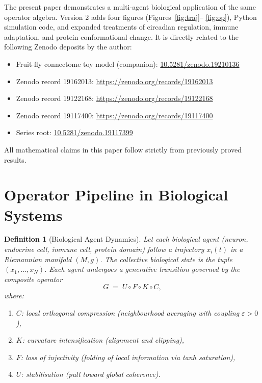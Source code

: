 \documentclass[12pt,a4paper]{article}
\newtheorem{definition}[theorem]{Definition}
\begin{document}
The present paper demonstrates a multi-agent biological application of the same
operator algebra.  Version 2 adds four figures (Figures~\ref{fig:traj}–%
\ref{fig:op}), Python simulation code, and expanded treatments of circadian
regulation, immune adaptation, and protein conformational change.  It is
directly related to the following Zenodo deposits by the author:

\begin{itemize}[nosep]
  \item Fruit-fly connectome toy model (companion):
    \href{https://doi.org/10.5281/zenodo.19210136}{10.5281/zenodo.19210136}
  \item Zenodo record 19162013:
    \url{https://zenodo.org/records/19162013}
  \item Zenodo record 19122168:
    \url{https://zenodo.org/records/19122168}
  \item Zenodo record 19117400:
    \url{https://zenodo.org/records/19117400}
  \item Series root: \href{https://doi.org/10.5281/zenodo.19117399}{10.5281/zenodo.19117399}
\end{itemize}

All mathematical claims in this paper follow strictly from previously proved
results.

\section{Operator Pipeline in Biological Systems}
\label{sec:pipeline}

\begin{definition}[Biological Agent Dynamics]
\label{def:agent}
Let each biological agent (neuron, endocrine cell, immune cell, protein domain)
follow a trajectory $x_i(t)$ in a Riemannian manifold $(M, g)$.  The collective
biological state is the tuple $(x_1, \ldots, x_N)$.  Each agent undergoes a
generative transition governed by the composite operator
\[
  G \;=\; U \circ F \circ K \circ C,
\]
where:
\begin{enumerate}[nosep,label=(\roman*)]
  \item $C$: \emph{local orthogonal compression} (neighbourhood averaging with
    coupling $\varepsilon > 0$),
  \item $K$: \emph{curvature intensification} (alignment and clipping),
  \item $F$: \emph{loss of injectivity} (folding of local information via tanh
    saturation),
  \item $U$: \emph{stabilisation} (pull toward global coherence).
\end{enumerate}
\end{definition}
\end{document}
